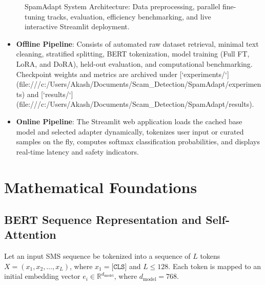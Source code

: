 \documentclass[conference]{IEEEtran}
\begin{document}
\begin{figure}[htbp]
\caption{SpamAdapt System Architecture: Data preprocessing, parallel fine-tuning tracks, evaluation, efficiency benchmarking, and live interactive Streamlit deployment.}
\label{fig:sys_arch}
\end{figure}

\begin{itemize}
    \item \textbf{Offline Pipeline}: Consists of automated raw dataset retrieval, minimal text cleaning, stratified splitting, BERT tokenization, model training (Full FT, LoRA, and DoRA), held-out evaluation, and computational benchmarking. Checkpoint weights and metrics are archived under [`experiments/`](file:///c:/Users/Akash/Documents/Scam_Detection/SpamAdapt/experiments) and [`results/`](file:///c:/Users/Akash/Documents/Scam_Detection/SpamAdapt/results).
    \item \textbf{Online Pipeline}: The Streamlit web application loads the cached base model and selected adapter dynamically, tokenizes user input or curated samples on the fly, computes softmax classification probabilities, and displays real-time latency and safety indicators.
\end{itemize}

\section{Mathematical Foundations}
\label{sec:math}

\subsection{BERT Sequence Representation and Self-Attention}
Let an input SMS sequence be tokenized into a sequence of $L$ tokens $X = (x_1, x_2, \dots, x_L)$, where $x_1 = \texttt{[CLS]}$ and $L \le 128$. Each token is mapped to an initial embedding vector $e_i \in \mathbb{R}^{d_{\text{model}}}$, where $d_{\text{model}} = 768$.
\end{document}
